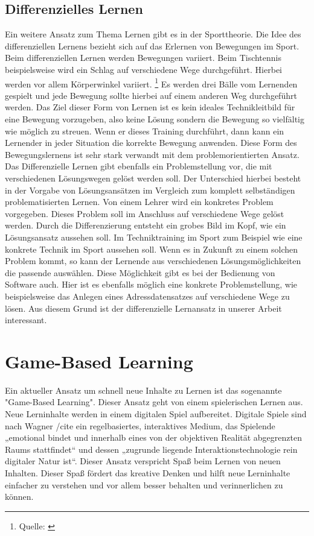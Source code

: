 \subsection{Differenzielles Lernen}
Ein weitere Ansatz zum Thema Lernen gibt es in der Sporttheorie. Die Idee des differenziellen Lernens bezieht sich auf das Erlernen von Bewegungen im Sport. Beim differenziellen Lernen werden Bewegungen variiert. Beim Tischtennis beispielsweise wird ein Schlag auf verschiedene Wege durchgeführt. Hierbei werden vor allem Körperwinkel variiert. \footnote{Quelle: \cite{differenziellesLernen}} Es werden drei Bälle vom Lernenden gespielt und jede Bewegung sollte hierbei auf einem anderen Weg durchgeführt werden. Das Ziel dieser Form von Lernen ist es kein ideales Technikleitbild für eine Bewegung vorzugeben, also keine Lösung sondern die Bewegung so vielfältig wie möglich zu streuen. Wenn er dieses Training durchführt, dann kann ein Lernender in jeder Situation die korrekte Bewegung anwenden. Diese Form des Bewegungslernens ist sehr stark verwandt mit dem problemorientierten Ansatz. Das Differenzielle Lernen gibt ebenfalls ein Problemstellung vor, die mit verschiedenen Lösungswegen gelöst werden soll. Der Unterschied hierbei besteht in der Vorgabe von Lösungsansätzen im Vergleich zum komplett selbständigen problematisierten Lernen. Von einem Lehrer wird ein konkretes Problem vorgegeben. Dieses Problem soll im Anschluss auf verschiedene Wege gelöst werden. Durch die Differenzierung entsteht ein grobes Bild im Kopf, wie ein Lösungsansatz aussehen soll. Im Techniktraining im Sport zum Beispiel wie eine konkrete Technik im Sport aussehen soll. Wenn es in Zukunft zu einem solchen Problem kommt, so kann der Lernende aus verschiedenen Lösungsmöglichkeiten die passende auswählen. Diese Möglichkeit gibt es bei der Bedienung von Software auch. Hier ist es ebenfalls möglich eine konkrete Problemstellung, wie beispielsweise das Anlegen eines Adressdatensatzes auf verschiedene Wege zu lösen. Aus diesem Grund ist der differenzielle Lernansatz in unserer Arbeit interessant.


\section{Game-Based Learning}
Ein aktueller Ansatz um schnell neue Inhalte zu Lernen ist das sogenannte "Game-Based Learning". Dieser Ansatz geht von einem spielerischen Lernen aus. Neue Lerninhalte werden in einem digitalen Spiel aufbereitet. Digitale Spiele sind nach Wagner /cite{} ein regelbasiertes,
interaktives Medium, das Spielende „emotional bindet und innerhalb eines von der objektiven Realität abgegrenzten Raums stattfindet“ und dessen „zugrunde liegende Interaktionstechnologie rein digitaler Natur ist“. Dieser Ansatz verspricht Spaß beim Lernen von neuen Inhalten. Dieser Spaß fördert das kreative Denken und hilft neue Lerninhalte einfacher zu verstehen und vor allem besser behalten und verinnerlichen zu können. 


